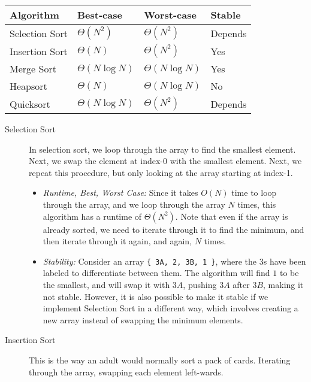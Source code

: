 \begin{solution}
{
\renewcommand{\arraystretch}{2}
\setlength{\tabcolsep}{12pt}
\begin{tabularx}{\textwidth}{Xlll}
Algorithm         & Best-case          & Worst-case          & Stable \\\hline
Selection Sort    & $\Theta(N^2)$      & $\Theta(N^2)$       & Depends\\
Insertion Sort    & $\Theta(N)$        & $\Theta(N^2)$       & Yes    \\
Merge Sort        & $\Theta(N \log N)$ & $\Theta(N \log N)$  & Yes    \\
Heapsort          & $\Theta(N)$        & $\Theta(N \log N)$  & No	  \\
Quicksort         & $\Theta(N \log N)$        & $\Theta(N^2)$       & Depends

\end{tabularx}
}

\begin{description}
\item[Selection Sort]
In selection sort, we loop through the array to find the smallest element.
Next, we swap the element at index-0 with the smallest element. Next, we repeat
this procedure, but only looking at the array starting at index-1.

\begin{itemize}
\item \textit{Runtime, Best, Worst Case:} Since it takes $O(N)$ time to loop
through the array, and we loop through the array $N$ times, this algorithm has
a runtime of $\Theta(N^2)$. Note that even if the array is already sorted, we
need to iterate through it to find the minimum, and then iterate through it
again, and again, $N$ times.
\item \textit{Stability:} Consider an array \lstinline${ 3A, 2, 3B, 1 }$, where
the $3$s have been labeled to differentiate between them. The algorithm will
find $1$ to be the smallest, and will swap it with $3A$, pushing $3A$ after
$3B$, making it not stable. However, it is also possible to make it stable if
we implement Selection Sort in a different way, which involves creating a new
array instead of swapping the minimum elements.
\end{itemize}

\item[Insertion Sort]
This is the way an adult would normally sort a pack of cards. Iterating through
the array, swapping each element left-wards.


\end{description}
\end{solution}
